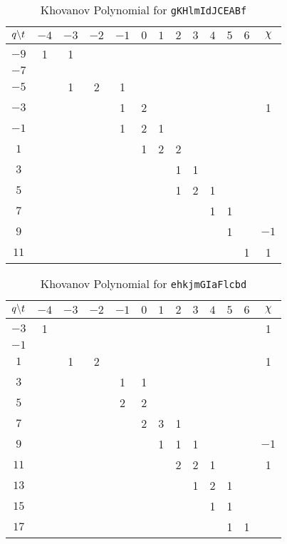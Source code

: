     \begin{table}
        \centering
        \begin{tabular}{| c | c | c | c | c | c | c | c | c | c | c | c | c |}
            \hline
            $q\symbol{92}t$&$-4$&$-3$&$-2$&$-1$&$0$&$1$&$2$&$3$&$4$&$5$&$6$&$\chi$\\
            \hline
            $-9$&1&1&&&&&&&&&&\\
            \hline
            $-7$&&&&&&&&&&&&\\
            \hline
            $-5$&&1&2&1&&&&&&&&\\
            \hline
            $-3$&&&&1&2&&&&&&&1\\
            \hline
            $-1$&&&&1&2&1&&&&&&\\
            \hline
            $1$&&&&&1&2&2&&&&&\\
            \hline
            $3$&&&&&&&1&1&&&&\\
            \hline
            $5$&&&&&&&1&2&1&&&\\
            \hline
            $7$&&&&&&&&&1&1&&\\
            \hline
            $9$&&&&&&&&&&1&&$-1$\\
            \hline
            $11$&&&&&&&&&&&1&1\\
            \hline
        \end{tabular}
        \caption{Khovanov Polynomial for \texttt{gKHlmIdJCEABf}}
    \end{table}
    \begin{table}
        \centering
        \begin{tabular}{| c | c | c | c | c | c | c | c | c | c | c | c | c |}
            \hline
            $q\symbol{92}t$&$-4$&$-3$&$-2$&$-1$&$0$&$1$&$2$&$3$&$4$&$5$&$6$&$\chi$\\
            \hline
            $-3$&1&&&&&&&&&&&1\\
            \hline
            $-1$&&&&&&&&&&&&\\
            \hline
            $1$&&1&2&&&&&&&&&1\\
            \hline
            $3$&&&&1&1&&&&&&&\\
            \hline
            $5$&&&&2&2&&&&&&&\\
            \hline
            $7$&&&&&2&3&1&&&&&\\
            \hline
            $9$&&&&&&1&1&1&&&&$-1$\\
            \hline
            $11$&&&&&&&2&2&1&&&1\\
            \hline
            $13$&&&&&&&&1&2&1&&\\
            \hline
            $15$&&&&&&&&&1&1&&\\
            \hline
            $17$&&&&&&&&&&1&1&\\
            \hline
        \end{tabular}
        \caption{Khovanov Polynomial for \texttt{ehkjmGIaFlcbd}}
    \end{table}
